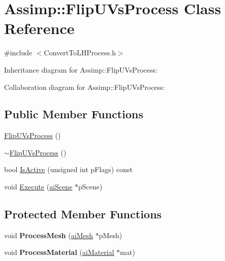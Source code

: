 \hypertarget{class_assimp_1_1_flip_u_vs_process}{\section{Assimp\+:\+:Flip\+U\+Vs\+Process Class Reference}
\label{class_assimp_1_1_flip_u_vs_process}
}


{\ttfamily \#include $<$Convert\+To\+L\+H\+Process.\+h$>$}



Inheritance diagram for Assimp\+:\+:Flip\+U\+Vs\+Process\+:


Collaboration diagram for Assimp\+:\+:Flip\+U\+Vs\+Process\+:
\subsection*{Public Member Functions}
\begin{DoxyCompactItemize}
\item 
\hyperlink{class_assimp_1_1_flip_u_vs_process_a04cab5c7b02ce1f9e17494b6eff3879c}{Flip\+U\+Vs\+Process} ()
\item 
\hyperlink{class_assimp_1_1_flip_u_vs_process_a1e9cd496cf8cfb268c8695eb8460f3ba}{$\sim$\+Flip\+U\+Vs\+Process} ()
\item 
bool \hyperlink{class_assimp_1_1_flip_u_vs_process_a3e39b132d59833cdceb1dacfb5dacd8a}{Is\+Active} (unsigned int p\+Flags) const 
\item 
void \hyperlink{class_assimp_1_1_flip_u_vs_process_a4ce58623df9d1c96eafccb2b2d7aed0f}{Execute} (\hyperlink{structai_scene}{ai\+Scene} $\ast$p\+Scene)
\end{DoxyCompactItemize}
\subsection*{Protected Member Functions}
\begin{DoxyCompactItemize}
\item 
\hypertarget{class_assimp_1_1_flip_u_vs_process_ae85cfae98aef7499cf930d6f74db38e3}{void {\bfseries Process\+Mesh} (\hyperlink{structai_mesh}{ai\+Mesh} $\ast$p\+Mesh)}\label{class_assimp_1_1_flip_u_vs_process_ae85cfae98aef7499cf930d6f74db38e3}

\item 
\hypertarget{class_assimp_1_1_flip_u_vs_process_ac842b52319b90bdde51dede82f08fe09}{void {\bfseries Process\+Material} (\hyperlink{classai_material}{ai\+Material} $\ast$mat)}\label{class_assimp_1_1_flip_u_vs_process_ac842b52319b90bdde51dede82f08fe09}

\end{DoxyCompactItemize}

